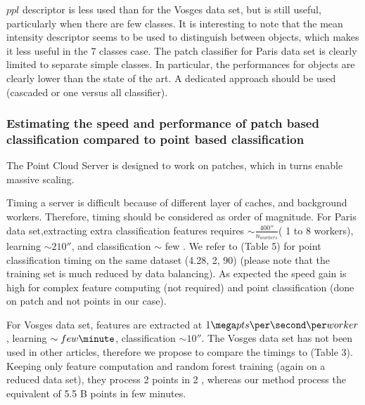 		  $ppl$ descriptor is less used than for the Vosges data set, but is still useful, particularly when there are few classes.
		  It is interesting to note that the mean intensity descriptor seems to be used to distinguish between objects, which makes it less useful in the 7 classes case.
		  The patch classifier for Paris data set is clearly limited to separate simple classes. In particular, the performances for objects are clearly lower than the state of the art. A dedicated approach should be used (cascaded or one versus all classifier). 
	  
	  
	  \subsubsection{Estimating the speed and performance of patch based classification compared to point based classification}
		  The Point Cloud Server is designed to work on patches, which in turns enable massive scaling. 
		  
		  Timing a server is difficult because of different layer of caches, and background workers. Therefore, timing should be considered as order of magnitude.
		  For Paris data set,extracting extra classification features requires $\sim \frac{400 \second}{n_{workers}}$( 1 to 8 workers), learning $\sim 210 \second$,
		  and classification $\sim$ few \second.
		  We refer to \cite{Weinmann2015}(Table 5) for point classification timing on the same dataset (4.28\hour, 2\second, 90\second ) (please note that the training set is much reduced by data balancing).
		  As expected the speed gain is high for complex feature computing (not required) and point classification (done on patch and not points in our case).
		  
		  For Vosges data set, features are extracted at $1 \mega pts \per \second \per worker$, learning $\sim few \minute$, classification $\sim 10 \second$.
		  The Vosges data set has not been used in other articles, therefore we propose to compare the timings to \cite{shapovalov2010} (Table 3). Keeping only feature computation and random forest training (again on a reduced data set), they process 2 \mega points in 2 \minute, whereas our method process the equivalent of 5.5 B points in few minutes.
		  
